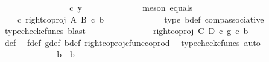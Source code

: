\begin{isabellebody}
\ \ \ \ \ \ \ \ \ \ \isamarkupfalse%
\ \isamarkupfalse%
\ {\isachardoublequoteopen}{\isachardot}{\kern0pt}{\isachardot}{\kern0pt}{\isachardot}{\kern0pt}\ {\isacharequal}{\kern0pt}\ {\isasymphi}\ {\isasymcirc}\isactrlsub c\ y{\isachardoublequoteclose}\isanewline
\ \ \ \ \ \ \ \ \ \ \ \ \isamarkupfalse%
\ {\isacharparenleft}{\kern0pt}meson\ equals{\isacharparenright}{\kern0pt}\isanewline
\ \ \ \ \ \ \ \ \ \ \isamarkupfalse%
\ \isamarkupfalse%
\ {\isachardoublequoteopen}{\isachardot}{\kern0pt}{\isachardot}{\kern0pt}{\isachardot}{\kern0pt}\ {\isacharequal}{\kern0pt}\ {\isacharparenleft}{\kern0pt}{\isasymphi}\ {\isasymcirc}\isactrlsub c\ right{\isacharunderscore}{\kern0pt}coproj\ A\ B{\isacharparenright}{\kern0pt}\ {\isasymcirc}\isactrlsub c\ b{\isacharprime}{\kern0pt}{\isachardoublequoteclose}\isanewline
\ \ \ \ \ \ \ \ \ \ \ \ \isamarkupfalse%
\ {\isasymphi}{\isacharunderscore}{\kern0pt}type\ b{\isacharprime}{\kern0pt}{\isacharunderscore}{\kern0pt}def\ comp{\isacharunderscore}{\kern0pt}associative{}\ \isamarkupfalse%
\ {\isacharparenleft}{\kern0pt}typecheck{\isacharunderscore}{\kern0pt}cfuncs{\isacharcomma}{\kern0pt}\ blast{\isacharparenright}{\kern0pt}\isanewline
\ \ \ \ \ \ \ \ \ \ \isamarkupfalse%
\ \isamarkupfalse%
\ {\isachardoublequoteopen}{\isachardot}{\kern0pt}{\isachardot}{\kern0pt}{\isachardot}{\kern0pt}\ {\isacharequal}{\kern0pt}\ {\isacharparenleft}{\kern0pt}right{\isacharunderscore}{\kern0pt}coproj\ C\ D\ {\isasymcirc}\isactrlsub c\ g{\isacharparenright}{\kern0pt}\ {\isasymcirc}\isactrlsub c\ b{\isacharprime}{\kern0pt}{\isachardoublequoteclose}\isanewline
\ \ \ \ \ \ \ \ \ \ \ \ \isamarkupfalse%
\ {\isasymphi}{\isacharunderscore}{\kern0pt}def\ \isamarkupfalse%
\ f{\isacharunderscore}{\kern0pt}def\ g{\isacharunderscore}{\kern0pt}def\ b{\isacharprime}{\kern0pt}{\isacharunderscore}{\kern0pt}def\ right{\isacharunderscore}{\kern0pt}coproj{\isacharunderscore}{\kern0pt}cfunc{\isacharunderscore}{\kern0pt}coprod\ \isamarkupfalse%
\ {\isacharparenleft}{\kern0pt}typecheck{\isacharunderscore}{\kern0pt}cfuncs{\isacharcomma}{\kern0pt}\ auto{\isacharparenright}{\kern0pt}\isanewline
\ \ \ \ \ \ \ \ \ \ \isamarkupfalse%
\ \isamarkupfalse%
\ {\isachardoublequoteopen}b\ {\isacharequal}{\kern0pt}\ b{\isacharprime}{\kern0pt}{\isachardoublequoteclose}\isanewline
\ \ \ \ \ \ \ \ \ \ \ \ \isamarkupfalse%

\end{isabellebody}
